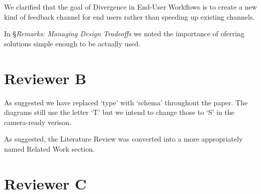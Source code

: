 \documentclass{article}
\begin{document}
We clarified that the goal of Divergence in End-User Workflows is to create a new kind of feedback channel for end users rather than speeding up existing channels.

In \S\emph{Remarks: Managing Design Tradeoffs} we noted the importance of oferring solutions simple enough to be actually used.

\section{Reviewer B}

As suggested we have replaced `type' with `schema' throughout the paper. The diagrams still use the letter `T' but we intend to change those to `S' in the camera-ready verison.

As suggested, the Literature Review was converted into a more appropriately named Related Work section.


\section{Reviewer C}
\end{document}
